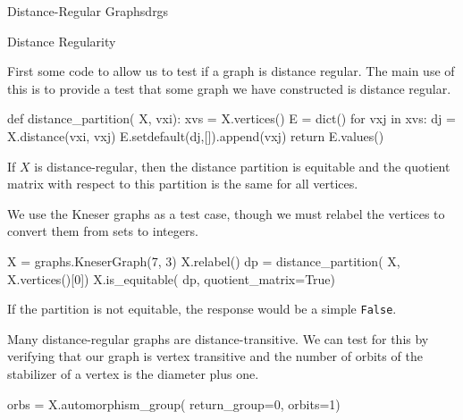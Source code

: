 \begin{chap}{Distance-Regular Graphs}{drgs}
%
\begin{sect}{Distance Regularity}
%
\begin{para}
First some code to allow us to test if a graph is distance regular.
The main use of this is to provide a test that some graph we have constructed is
distance regular.
\end{para}
%
\begin{sagecode}
\begin{sageinput}
def distance_partition( X, vxi):
    xvs = X.vertices()
    E = dict()
    for vxj in xvs:
        dj = X.distance(vxi, vxj)
        E.setdefault(dj,[]).append(vxj)
    return E.values()    
\end{sageinput}
\end{sagecode}
%    
\begin{para}
If $X$ is distance-regular, then the distance partition is equitable
and the quotient matrix with respect to this partition is the same for all
vertices. 
\end{para}
%
\begin{para}
We use the Kneser graphs as a test case, though we must relabel the vertices to convert them from sets to integers.
\end{para}
%
\begin{sagecode}
\begin{sageinput}
X = graphs.KneserGraph(7, 3)
X.relabel()
dp = distance_partition( X, X.vertices()[0])
X.is_equitable( dp, quotient_matrix=True) 
\end{sageinput}
\begin{sageoutput}
[0 4 0 0]                               
[1 0 3 0]                               
[0 1 0 3]                               
[0 0 2 2]
\end{sageoutput}
\end{sagecode}
%
\begin{para}
If the partition is not equitable, the response would be a simple
\verb|False|.
\end{para}
%
\begin{para}
Many distance-regular graphs are distance-transitive. We can test for this
by verifying that our graph is vertex transitive and the number of
orbits of the stabilizer of a vertex is the diameter plus one.
\end{para}
%
\begin{sagecode}
\begin{sageinput}
orbs = X.automorphism_group( return_group=0, orbits=1)

\end{sageinput}
\end{sagecode}
\end{sect}
\end{chap}
